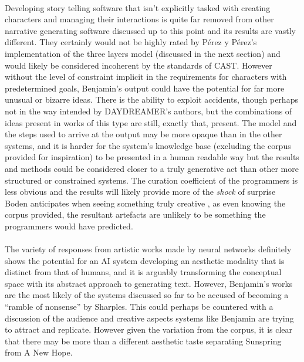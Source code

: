 \documentclass[letterpaper]{article}
\begin{document}
\\Developing story telling software that isn't explicitly tasked with creating characters and managing their interactions is quite far removed from other narrative generating software discussed up to this point and its results are vastly different. They certainly would not be highly rated by P\'erez y P\'erez's implementation of the three layers model (discussed in the next section) and would likely be considered incoherent by the standards of CAST. However without the level of constraint implicit in the requirements for characters with predetermined goals, Benjamin's output could have the potential for far more unusual or bizarre ideas. There is the ability to exploit accidents, though perhaps not in the way intended by DAYDREAMER's authors, but the combinations of ideas present in works of this type are still, exactly that, present. The model and the steps used to arrive at the output may be more opaque than in the other systems, and it is harder for the system's knowledge base (excluding the corpus provided for inspiration) to be presented in a human readable way but the results and methods could be considered closer to a truly generative act than other more structured or constrained systems. The curation coefficient of the programmers is less obvious and the results will likely provide more of the \emph{shock} of surprise Boden anticipates when seeing something truly creative \cite{BODEN1998347}, as even knowing the corpus provided, the resultant artefacts are unlikely to be something the programmers would have predicted.\\
\\The variety of responses from artistic works made by neural networks definitely shows the potential for an AI system developing an aesthetic modality that is distinct from that of humans, and it is arguably transforming the conceptual space with its abstract approach to generating text. However, Benjamin's works are the most likely of the systems discussed so far to be accused of becoming a \enquote{ramble of nonsense} by Sharples. This could perhaps be countered with a discussion of the audience and creative aspects systems like Benjamin are trying to attract and replicate. However given the variation from the corpus, it is clear that there may be more than a different aesthetic taste separating Sunspring from A New Hope.\\
\end{document}
